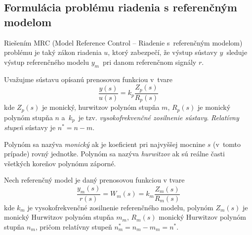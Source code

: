 \documentclass[a4paper, 10pt, ]{article}
\begin{document}
\subsection{Formulácia problému riadenia s referenčným modelom}
\label{MRC problém}



Riešením MRC (Model Reference Control -- Riadenie s~referenčným modelom) problému je taký zákon riadenia $u$, ktorý zabezpečí, že výstup sústavy $y$~sleduje výstup referenčného modelu $y_m$~pri danom referenčnom signály $r$.



Uvažujme sústavu opísanú prenosovou funkciou v~tvare
\begin{equation} \label{PFsustavy_MRCp}
	\frac{y(s)}{u(s)} = k_p \frac{Z_p(s)}{R_p(s)}
\end{equation}
kde $Z_p(s)$ je monický, hurwitzov polynóm stupňa $m$, $R_p(s)$ je monický polynóm stupňa $n$ a~$k_p$~je tzv. \emph{vysokofrekvenčné zosilnenie sústavy}. \emph{Relatívny stupeň} sústavy je $n^* = n - m$.

Polynóm sa nazýva \emph{monický} ak je koeficient pri najvyššej mocnine $s$ (v~tomto prípade) rovný jednotke. Polynóm sa nazýva \emph{hurwitzov} ak sú reálne časti všetkých koreňov polynómu záporné.

Nech referenčný model je daný prenosovou funkciou v tvare
\begin{equation} \label{RefModelMRCp}
	\frac{y_m(s)}{r(s)} = W_m(s) = k_m \frac{Z_m(s)}{R_m(s)}
\end{equation}
kde $k_m$ je vysokofrekvenčné zosilnenie referenčného modelu, polynóm $Z_m(s)$ je monický Hurwitzov polynóm stupňa $m_m$, $R_m(s)$ monický Hurwitzov polynóm stupňa $n_m$, pričom relatívny stupeň $n^*_m = n_m - m_m = n^*$.
\end{document}
